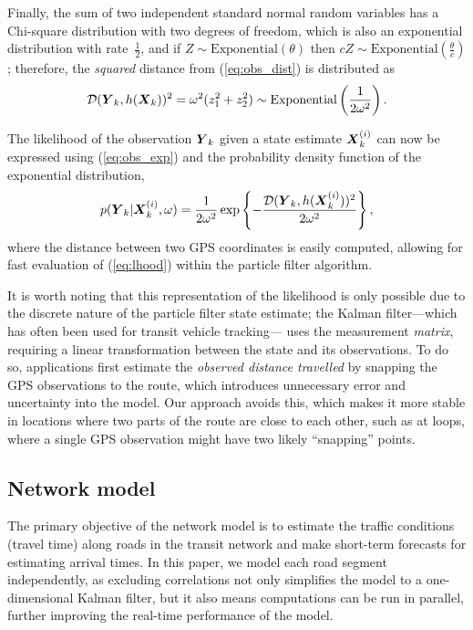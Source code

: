 Finally, the sum of two independent
standard normal random variables has a Chi-square distribution with two degrees of freedom,
which is also an exponential distribution with rate~$\frac{1}{2}$,
and if $Z \sim \mathrm{Exponential}(\theta)$ then
$cZ \sim \mathrm{Exponential}(\frac{\theta}{c})$;
therefore, the \emph{squared} distance from (\ref{eq:obs_dist}) is distributed as
\begin{equation}
\label{eq:obs_exp}
\mathcal{D}(\mbox{$\boldsymbol{Y}$}_k, h(\mbox{$\boldsymbol{X}$}_k))^2 =
\omega^2(z_1^2 + z_2^2) \sim \mathrm{Exponential}\left(\frac{1}{2\omega^2}\right).
\end{equation}

The likelihood of the observation $\mbox{$\boldsymbol{Y}$}_k$ given a state estimate $\mbox{$\boldsymbol{X}$}_k^{(i)}$
can now be expressed using (\ref{eq:obs_exp})
and the probability density function of the exponential distribution,
\begin{equation}
\label{eq:lhood}
p(\mbox{$\boldsymbol{Y}$}_k | \mbox{$\boldsymbol{X}$}_k^{(i)}, \omega) =
\frac{1}{2\omega^2}\exp\left\{
    -\frac{\mathcal{D}(\mbox{$\boldsymbol{Y}$}_k, h(\mbox{$\boldsymbol{X}$}_k^{(i)}))^2}{2\omega^2}
\right\},
\end{equation}
where the distance between two GPS coordinates is easily computed,
allowing for fast evaluation of (\ref{eq:lhood}) within the particle filter algorithm.


It is worth noting that this representation of the likelihood is only
possible due to the discrete nature of the particle filter state estimate;
the Kalman filter---which has often been used for transit vehicle tracking---%
uses the measurement \emph{matrix}, requiring a linear
transformation between the state and its observations.
To do so, applications first estimate the \emph{observed distance travelled}
by snapping the GPS observations to the route,
which introduces unnecessary error and uncertainty into the model.
Our approach avoids this, which makes it more stable in locations where two
parts of the route are close to each other,
such as at loops, where a single GPS observation might have two likely ``snapping'' points.


\subsection{Network model}
\label{sec:kf}

The primary objective of the network model is to estimate the \rt traffic conditions
(travel time) along roads in the transit network
and make short-term forecasts for estimating arrival times.
In this paper, we model each road segment independently,
as excluding correlations not only simplifies the model to a one-dimensional Kalman filter,
but it also means computations can be run in parallel,
further improving the real-time performance of the model.


